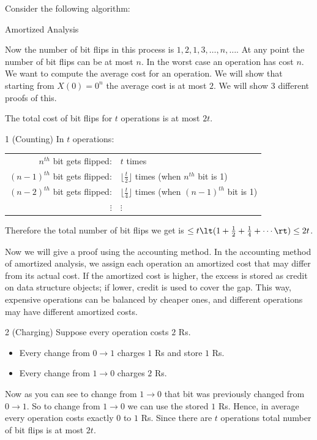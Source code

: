 Consider the following algorithm:
\begin{algorithm}[]
	\caption{Amortized Analysis}
	\DontPrintSemicolon
\end{algorithm}
Now the number of bit flips in this process is $1,2,1,3,\dots, n,\dots$. At any point the number of bit flips can be at most $n$. In the worst case an operation has cost $n$. We want to compute the average cost for an operation. We will show that starting from $X(0)=0^n$ the average cost is at most $2$. We will show 3 different proofs of this.
\begin{lemma}{}{}
	The total  cost of bit flips for $t$ operations is at most $2t$.
\end{lemma}
\begin{proofmany}{1 (Counting)}
	In $t$ operations:
	\begin{center}
		\begin{tabular}{rl}
			$n^{th}$ bit gets flipped:     & $t$ times                                                    \\
			$(n-1)^{th}$ bit gets flipped: & $\lfloor\frac{t}2\rfloor$ times (when $n^{th}$ bit is 1)     \\
			$(n-2)^{th}$ bit gets flipped: & $\lfloor\frac{t}4\rfloor$ times (when $(n-1)^{th}$ bit is 1) \\
			$\vdots$\hspace{1cm}           & \hspace{1cm}$\vdots$
		\end{tabular}
	\end{center}
	Therefore the total number of bit flips we get is $\leq t\lt(1+\frac12+\frac14+\cdots\rt)\leq 2t$.
\end{proofmany}

Now we will give a proof using the accounting method. In the accounting method of amortized analysis, we assign each operation an amortized cost that may differ from its actual cost. If the amortized cost is higher, the excess is stored as credit on data structure objects; if lower, credit is used to cover the gap. This way, expensive operations can be balanced by cheaper ones, and different operations may have different amortized costs.

\begin{proofmany}{2 (Charging)}
	Suppose every operation costs $2$ Rs. \begin{itemize}
		\item Every change from $0\to 1$ charges $1$ Rs and store $1$ Rs.
		\item Every change from $1\to 0$ charges $2$ Rs.
	\end{itemize}
	Now as you can see to change from $1\to 0$ that bit was previously changed from $0\to 1$. So to change from $1\to 0$ we can use the stored $1$ Rs. Hence, in average every operation costs exactly $0$ to $1$ Rs. Since there are $t$ operations total number of bit flips is at most $2t$.
\end{proofmany}

